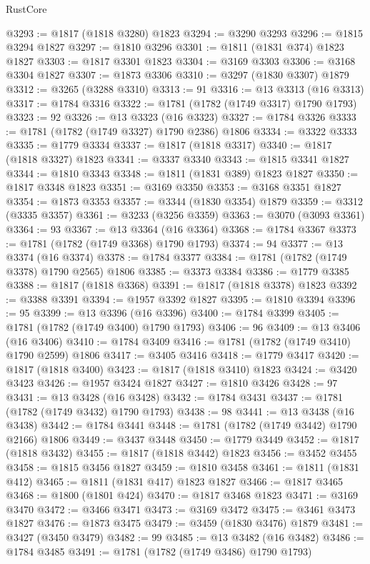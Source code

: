 \begin{lexlean}{RustCore}
\begin{coremodule}
@3293 := @1817 (@1818 @3280) @1823
@3294 := @3290 @3293
@3296 := @1815 @3294 @1827
@3297 := @1810 @3296
@3301 := @1811 (@1831 @374) @1823 @1827
@3303 := @1817 @3301 @1823
@3304 := @3169 @3303
@3306 := @3168 @3304 @1827
@3307 := @1873 @3306
@3310 := @3297 (@1830 @3307) @1879
@3312 := @3265 (@3288 @3310)
@3313 := 91
@3316 := @13 @3313 (@16 @3313)
@3317 := @1784 @3316
@3322 := @1781 (@1782 (@1749 @3317) @1790 @1793)
@3323 := 92
@3326 := @13 @3323 (@16 @3323)
@3327 := @1784 @3326
@3333 := @1781 (@1782 (@1749 @3327) @1790 @2386) @1806
@3334 := @3322 @3333
@3335 := @1779 @3334
@3337 := @1817 (@1818 @3317)
@3340 := @1817 (@1818 @3327) @1823
@3341 := @3337 @3340
@3343 := @1815 @3341 @1827
@3344 := @1810 @3343
@3348 := @1811 (@1831 @389) @1823 @1827
@3350 := @1817 @3348 @1823
@3351 := @3169 @3350
@3353 := @3168 @3351 @1827
@3354 := @1873 @3353
@3357 := @3344 (@1830 @3354) @1879
@3359 := @3312 (@3335 @3357)
@3361 := @3233 (@3256 @3359)
@3363 := @3070 (@3093 @3361)
@3364 := 93
@3367 := @13 @3364 (@16 @3364)
@3368 := @1784 @3367
@3373 := @1781 (@1782 (@1749 @3368) @1790 @1793)
@3374 := 94
@3377 := @13 @3374 (@16 @3374)
@3378 := @1784 @3377
@3384 := @1781 (@1782 (@1749 @3378) @1790 @2565) @1806
@3385 := @3373 @3384
@3386 := @1779 @3385
@3388 := @1817 (@1818 @3368)
@3391 := @1817 (@1818 @3378) @1823
@3392 := @3388 @3391
@3394 := @1957 @3392 @1827
@3395 := @1810 @3394
@3396 := 95
@3399 := @13 @3396 (@16 @3396)
@3400 := @1784 @3399
@3405 := @1781 (@1782 (@1749 @3400) @1790 @1793)
@3406 := 96
@3409 := @13 @3406 (@16 @3406)
@3410 := @1784 @3409
@3416 := @1781 (@1782 (@1749 @3410) @1790 @2599) @1806
@3417 := @3405 @3416
@3418 := @1779 @3417
@3420 := @1817 (@1818 @3400)
@3423 := @1817 (@1818 @3410) @1823
@3424 := @3420 @3423
@3426 := @1957 @3424 @1827
@3427 := @1810 @3426
@3428 := 97
@3431 := @13 @3428 (@16 @3428)
@3432 := @1784 @3431
@3437 := @1781 (@1782 (@1749 @3432) @1790 @1793)
@3438 := 98
@3441 := @13 @3438 (@16 @3438)
@3442 := @1784 @3441
@3448 := @1781 (@1782 (@1749 @3442) @1790 @2166) @1806
@3449 := @3437 @3448
@3450 := @1779 @3449
@3452 := @1817 (@1818 @3432)
@3455 := @1817 (@1818 @3442) @1823
@3456 := @3452 @3455
@3458 := @1815 @3456 @1827
@3459 := @1810 @3458
@3461 := @1811 (@1831 @412)
@3465 := @1811 (@1831 @417) @1823 @1827
@3466 := @1817 @3465
@3468 := @1800 (@1801 @424)
@3470 := @1817 @3468 @1823
@3471 := @3169 @3470
@3472 := @3466 @3471
@3473 := @3169 @3472
@3475 := @3461 @3473 @1827
@3476 := @1873 @3475
@3479 := @3459 (@1830 @3476) @1879
@3481 := @3427 (@3450 @3479)
@3482 := 99
@3485 := @13 @3482 (@16 @3482)
@3486 := @1784 @3485
@3491 := @1781 (@1782 (@1749 @3486) @1790 @1793)

\end{coremodule}
\end{lexlean}
